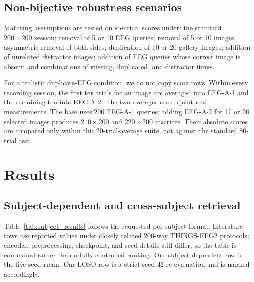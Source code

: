 \documentclass{article}
\begin{document}
\subsection{Non-bijective robustness scenarios}

Matching assumptions are tested on identical scores under: the standard $200\times200$ session; removal of 5 or 10 EEG queries; removal of 5 or 10 images; asymmetric removal of both sides; duplication of 10 or 20 gallery images; addition of unrelated distractor images; addition of EEG queries whose correct image is absent; and combinations of missing, duplicated, and distractor items.

For a realistic duplicate-EEG condition, we do not copy score rows. Within every recording session, the first ten trials for an image are averaged into EEG-A-1 and the remaining ten into EEG-A-2. The two averages are disjoint real measurements. The base uses 200 EEG-A-1 queries; adding EEG-A-2 for 10 or 20 selected images produces $210\times200$ and $220\times200$ matrices. Their absolute scores are compared only within this 20-trial-average suite, not against the standard 80-trial test.

\section{Results}
\label{sec:results}

\subsection{Subject-dependent and cross-subject retrieval}

Table~\ref{tab:subject_results} follows the requested per-subject format. Literature rows use reported values under closely related 200-way THINGS-EEG2 protocols; encoder, preprocessing, checkpoint, and seed details still differ, so the table is contextual rather than a fully controlled ranking. Our subject-dependent row is the five-seed mean. Our LOSO row is a strict seed-42 re-evaluation and is marked accordingly.
\end{document}
